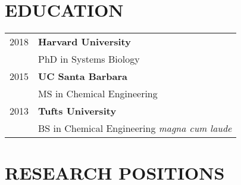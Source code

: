 \documentclass[line,10pt]{res}
\begin{document}
\null\hspace{0in}{\large\bf JOHN H ABEL}\\[0.5em]
\null\hspace{0.5em}{Massachusetts General Hospital, Harvard Medical School}\\
\null\hspace{0.5em}{Massachusetts Institute of Technology}\\
\null\hspace{0.5em}{abelj (at) mit (dot) edu}\\
\null\hspace{0.5em}{www.neurostat.mit.edu}%
\vspace{1em}

\begin{resume}



\section{\bf EDUCATION}
\vspace{1em}
\begin{tabular}{p{1.0in} p{5.5in}}
 2018 & \textbf{Harvard University}\\
      & PhD in Systems Biology\\[0.8em]
 2015 & \textbf{UC Santa Barbara}\\
      & MS in Chemical Engineering\\[0.8em]
 2013 & \textbf{Tufts University}\\
      & BS in Chemical Engineering \textit{magna cum laude}\\
\end{tabular}

\section{\bf RESEARCH POSITIONS} %
\vspace{1em}


\end{resume}
\end{document}
